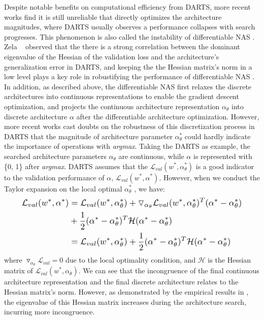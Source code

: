\documentclass[10pt,twocolumn,letterpaper]{article}
\begin{document}
Despite notable benefits on computational efficiency from DARTS, more recent works find it is still unreliable \cite{zela2019understanding,chen2020stabilizing} that directly optimizes the architecture magnitudes, where DARTS usually observes a performance collapses with search progresses. This phenomenon is also called the instability of differentiable NAS  \cite{chen2020stabilizing}. Zela \etal~\cite{zela2019understanding} observed that the there is a strong correlation between the dominant eigenvalue of the Hessian of the validation loss and the architecture’s generalization error in DARTS, and keeping the the Hessian matrix's norm in a low level plays a key role in robustifying the performance of differentiable NAS \cite{chen2020stabilizing}. In addition, as described above, the differentiable NAS first relaxes the discrete architectures into continuous representations to enable the gradient descent optimization, and projects the continuous architecture representation $\alpha_{\theta}$ into discrete architecture $\alpha$ after the differentiable architecture optimization. However, more recent works \cite{Rethinking2021} cast doubts on the robustness of this discretization process in DARTS that the magnitude of architecture parameter $\alpha_{\theta}^*$ could hardly indicate the importance of operations with \textit{argmax}. Taking the DARTS as example, the searched architecture parameters $\alpha_{\theta}$ are continuous, while $\alpha$ is represented with \{0, 1\} after \textit{argmax}. DARTS assumes that the $\mathcal{L}_{val}(w^*,\alpha_{\theta}^*)$ is a good indicator to the validation performance of $\alpha$, $\mathcal{L}_{val}(w^*,\alpha^*)$. However, when we conduct the Taylor expansion on the local optimal $\alpha_{\theta}^*$ \cite{chen2020stabilizing,chen2020drnas}, we have:
\begin{equation} \label{eq:instability}
\resizebox{.9\linewidth}{!}{$
    \displaystyle
\begin{aligned}
\mathcal{L}_{val}(w^*,\alpha^*)&=\mathcal{L}_{val}(w^*,\alpha_{\theta}^*)+\triangledown_{\alpha_\theta}\mathcal{L}_{val}(w^*,\alpha_{\theta}^*)^T(\alpha^*-\alpha_{\theta}^*)\\
&+\frac{1}{2} (\alpha^*-\alpha_{\theta}^*)^{T}\mathcal{H}(\alpha^*-\alpha_{\theta}^*)\\
&=\mathcal{L}_{val}(w^*,\alpha_{\theta}^*)+\frac{1}{2} (\alpha^*-\alpha_{\theta}^*)^{T}\mathcal{H}(\alpha^*-\alpha_{\theta}^*)
\end{aligned}
$}
\end{equation}
where $\triangledown_{\alpha_\theta}\mathcal{L}_{val}=0$ due to the local optimality condition, and $\mathcal{H}$ is the Hessian matrix of $\mathcal{L}_{val}(w^*,\alpha_{\theta})$. We can see that the incongruence of the final continuous architecture representation and the final discrete architecture relates to the Hessian matrix's norm. However, as demonstrated by the empirical results in \cite{zela2019understanding}, the eigenvalue of this Hessian matrix increases during the architecture search, incurring more incongruence. 
\end{document}
